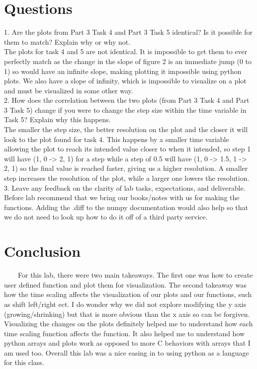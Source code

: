 \documentclass[11pt,a4]{article}
\begin{document}
\section{Questions}
1. Are the plots from Part 3 Task 4 and Part 3 Task 5 identical? Is it possible for them to match? Explain why or why not.
\\
The plots for task 4 and 5 are not identical. It is impossible to get them to ever perfectly match as the change in the slope of figure 2 is an immediate jump (0 to 1) so would have an infinite slope, making plotting it impossible using python plots. We also have a slope of infinity, which is impossible to visualize on a plot and must be visualized in some other way.
\\
2. How does the correlation between the two plots (from Part 3 Task 4 and Part 3 Task 5) change if you were to change the step size within the time variable in Task 5? Explain why this happens.
\\
The smaller the step size, the better resolution on the plot and the closer it will look to the plot found for task 4. This happens by a smaller time variable allowing the plot to reach its intended value closer to when it intended, so step 1 will have (1, 0 -> 2, 1) for a step while a step of 0.5 will have (1, 0 -> 1.5, 1 -> 2, 1) so the final value is reached faster, giving us a higher resolution. A smaller step increases the resolution of the plot, while a larger one lowers the resolution.
\\
3. Leave any feedback on the clarity of lab tasks, expectations, and deliverable.
\\
Before lab recommend that we bring our books/notes with us for making the functions. Adding the .diff to the numpy documentation would also help so that we do not need to look up how to do it off of a third party service.

\section{Conclusion}
\ \ \ \ For this lab, there were two main takeaways. The first one was how to create user defined function and plot them for visualization. The second takeaway was how the time scaling affects the visualization of our plots and our functions, such as shift left/right ect. I do wonder why we did not explore modifying the y axis (growing/shrinking) but that is more obvious than the x axis so can be forgiven. Visualizing the changes on the plots definitely helped me to understand how each time scaling function affects the function. It also helped me to understand how python arrays and plots work as opposed to more C behaviors with arrays that I am used too. Overall this lab was a nice easing in to using python as a language for this class.
\end{document}

